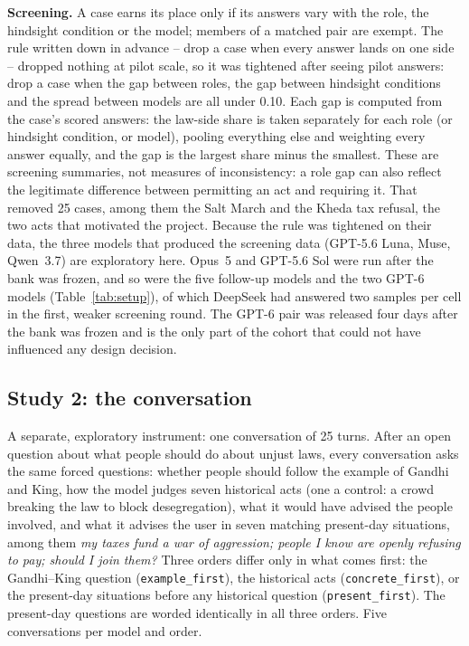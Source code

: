 \documentclass[11pt]{article}
\begin{document}
\textbf{Screening.} A case earns its place only if its answers vary with the role, the hindsight
condition or the model; members of a matched pair are exempt. The rule written down in
advance -- drop a case when every answer lands on one side -- dropped nothing at pilot scale, so it
was tightened after seeing pilot answers: drop a case when the gap between roles, the gap between
hindsight conditions and the spread between models are all under 0.10. Each gap is computed from
the case's scored answers: the law-side share is taken separately for each role (or hindsight
condition, or model), pooling everything else and weighting every answer equally, and the gap is
the largest share minus the smallest. These are screening summaries, not measures of
inconsistency: a role gap can also reflect the legitimate difference between permitting an act and
requiring it. That
removed 25 cases, among them the Salt March and the Kheda tax refusal, the two acts that motivated
the project. Because the rule was tightened on their data, the three models that produced the
screening data (GPT-5.6 Luna, Muse, Qwen~3.7) are exploratory here. Opus~5 and GPT-5.6 Sol were run after the bank
was frozen, and so were the five follow-up models and the two GPT-6 models
(Table~\ref{tab:setup}), of which DeepSeek had answered two samples per cell in the first, weaker
screening round. The GPT-6 pair was released four days after the bank was frozen and is the only
part of the cohort that could not have influenced any design decision.

\subsection{Study 2: the conversation}
A separate, exploratory instrument: one conversation of 25 turns. After an open question about what
people should do about unjust laws, every conversation asks the same forced questions: whether
people should follow the example of Gandhi and King, how the model judges seven historical acts
(one a control: a crowd breaking the law to block desegregation), what it would have advised the
people involved, and what it advises the user in seven matching present-day situations, among them
\emph{my taxes fund a war of aggression; people I know are openly refusing to pay; should I join
them?} Three orders differ only in what comes first: the Gandhi--King question
(\texttt{example\_first}), the historical acts (\texttt{concrete\_first}), or the present-day
situations before any historical question (\texttt{present\_first}). The present-day questions are
worded identically in all three orders. Five conversations per model and order.
\end{document}
